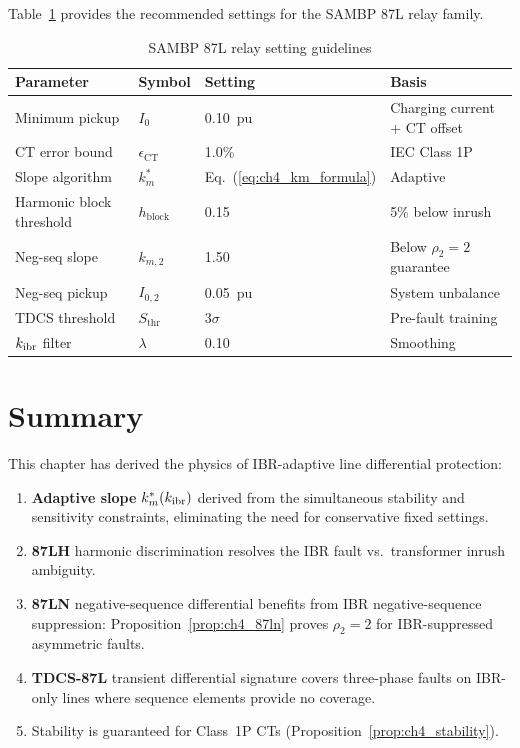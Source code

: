 Table~\ref{tab:ch4_settings} provides the recommended settings for the
SAMBP 87L relay family.

\begin{table}[htbp]
\caption{SAMBP 87L relay setting guidelines}
\label{tab:ch4_settings}
\begin{tabularx}{\textwidth}{@{}lXXl@{}}
\toprule
Parameter & Symbol & Setting & Basis \\
\midrule
Minimum pickup & $I_0$ & 0.10~pu & Charging current + CT offset \\
CT error bound & $\epsilon_\mathrm{CT}$ & 1.0\% & IEC Class 1P \\
Slope algorithm & $k_m^\ast$ & Eq.~(\ref{eq:ch4_km_formula}) & Adaptive \\
Harmonic block threshold & $h_\mathrm{block}$ & 0.15 & 5\% below inrush \\
Neg-seq slope & $k_{m,2}$ & 1.50 & Below $\rho_2 = 2$ guarantee \\
Neg-seq pickup & $I_{0,2}$ & 0.05~pu & System unbalance \\
TDCS threshold & $S_\mathrm{thr}$ & $3\sigma$ & Pre-fault training \\
$k_\mathrm{ibr}$ filter & $\lambda$ & 0.10 & Smoothing \\
\bottomrule
\end{tabularx}
\end{table}

\section{Summary}
\label{sec:ch4_summary}

This chapter has derived the physics of IBR-adaptive line differential
protection:
\begin{enumerate}
\item \textbf{Adaptive slope} $k_m^\ast(k_\mathrm{ibr})$ derived from the
      simultaneous stability and sensitivity constraints, eliminating
      the need for conservative fixed settings.
\item \textbf{87LH} harmonic discrimination resolves the IBR fault vs.\
      transformer inrush ambiguity.
\item \textbf{87LN} negative-sequence differential benefits from IBR
      negative-sequence suppression: Proposition~\ref{prop:ch4_87ln}
      proves $\rho_2 = 2$ for IBR-suppressed asymmetric faults.
\item \textbf{TDCS-87L} transient differential signature covers three-phase
      faults on IBR-only lines where sequence elements provide no coverage.
\item Stability is guaranteed for Class~1P CTs (Proposition~\ref{prop:ch4_stability}).
\end{enumerate}



